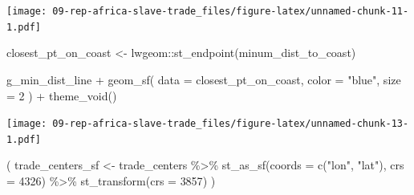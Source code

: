 \documentclass[
  oneside]{book}
\newenvironment{Shaded}{\begin{snugshade}}{\end{snugshade}}
\newcommand{\AttributeTok}[1]{\textcolor[rgb]{0.77,0.63,0.00}{#1}}
\newcommand{\DecValTok}[1]{\textcolor[rgb]{0.00,0.00,0.81}{#1}}
\newcommand{\FunctionTok}[1]{\textcolor[rgb]{0.00,0.00,0.00}{#1}}
\newcommand{\NormalTok}[1]{#1}
\newcommand{\OtherTok}[1]{\textcolor[rgb]{0.56,0.35,0.01}{#1}}
\newcommand{\SpecialCharTok}[1]{\textcolor[rgb]{0.00,0.00,0.00}{#1}}
\newcommand{\StringTok}[1]{\textcolor[rgb]{0.31,0.60,0.02}{#1}}
\begin{document}
\texttt{[image: 09-rep-africa-slave-trade\_files/figure-latex/unnamed-chunk-11-1.pdf]}

\begin{Shaded}
\begin{Highlighting}[]
\NormalTok{closest\_pt\_on\_coast }\OtherTok{\textless{}{-}}\NormalTok{ lwgeom}\SpecialCharTok{::}\FunctionTok{st\_endpoint}\NormalTok{(minum\_dist\_to\_coast)}
\end{Highlighting}
\end{Shaded}

\begin{Shaded}
\begin{Highlighting}[]
\NormalTok{g\_min\_dist\_line }\SpecialCharTok{+}
  \FunctionTok{geom\_sf}\NormalTok{(}
    \AttributeTok{data =}\NormalTok{ closest\_pt\_on\_coast,}
    \AttributeTok{color =} \StringTok{"blue"}\NormalTok{,}
    \AttributeTok{size =} \DecValTok{2}
\NormalTok{  ) }\SpecialCharTok{+}
  \FunctionTok{theme\_void}\NormalTok{()}
\end{Highlighting}
\end{Shaded}

\texttt{[image: 09-rep-africa-slave-trade\_files/figure-latex/unnamed-chunk-13-1.pdf]}

\begin{Shaded}
\end{Shaded}

\begin{Shaded}
\begin{Highlighting}[]
\NormalTok{(}
\NormalTok{  trade\_centers\_sf }\OtherTok{\textless{}{-}}
\NormalTok{    trade\_centers }\SpecialCharTok{\%\textgreater{}\%}
    \FunctionTok{st\_as\_sf}\NormalTok{(}\AttributeTok{coords =} \FunctionTok{c}\NormalTok{(}\StringTok{"lon"}\NormalTok{, }\StringTok{"lat"}\NormalTok{), }\AttributeTok{crs =} \DecValTok{4326}\NormalTok{) }\SpecialCharTok{\%\textgreater{}\%}
    \FunctionTok{st\_transform}\NormalTok{(}\AttributeTok{crs =} \DecValTok{3857}\NormalTok{)}
\NormalTok{)}
\end{Highlighting}
\end{Shaded}
\end{document}
